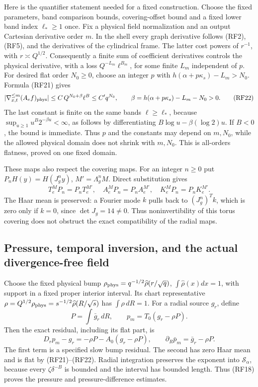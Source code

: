 \documentclass[10pt,a4paper]{article}
\begin{document}
Here is the quantifier statement needed for a fixed construction.
Choose the fixed parameters, band comparison bounds, covering-offset
bound and a fixed lower band index \(\ell_*\ge1\) once. Fix a
physical field normalization and an output Cartesian derivative order
\(m\). In the shell every graph derivative follows (RF2), (RF5),
and the derivatives of the cylindrical frame. The latter cost powers
of \(r^{-1}\), with \(r\asymp Q^{1/2}\). Consequently a
finite sum of coefficient derivatives controls the physical derivative,
with a loss \(Q^{-L_m}\ell^{B_m}\), for some finite \(L_m\)
independent of \(p\). For desired flat order \(N_0\ge0\),
choose an integer \(p\) with
\(h(\alpha+p\kappa_s)-L_m>N_0\). Formula (RF21) gives
\[
|\nabla_{x,t}^{\le m}(A_ef)_{\rm phys}|
\le C\,Q^{N_0+\beta}\ell^B\le C' q^{N_0},
\qquad\beta=h(\alpha+p\kappa_s)-L_m-N_0>0.
\tag{RF22}
\]
The last constant is finite on the same bands \(\ell\ge\ell_*\),
because \(\sup_{u\ge1}u^B2^{-\beta u}<\infty\), as follows by
differentiating \(B\log u-\beta(\log2)u\). If \(B<0\), the
bound is immediate. Thus \(p\) and the constants may depend on
\(m,N_0\), while the allowed physical domain does not shrink with
\(m,N_0\). This is all-orders flatness, proved on one fixed domain.

These maps also respect the covering maps. For an integer \(n\ge0\)
put \(P_nH(y)=H(J_g^ny)\), \(M'=\Lambda_g^nM\). Direct
substitution gives
\[
T_e^{M}P_n=P_nT_e^{M'},\quad A_e^{M}P_n=P_nA_e^{M'},
\quad K_e^{M}P_n=P_nK_e^{M'}.
\tag{RF23}
\]
The Haar mean is preserved: a Fourier mode \(k\) pulls back to
\((J_g^n)^Tk\), which is zero only if \(k=0\), since
\(\det J_g=14\ne0\). Thus noninvertibility of this torus covering
does not obstruct the exact compatibility of the radial maps.

\subsection{Pressure, temporal inversion, and the actual divergence-free field}

Choose the fixed physical bump
\(\rho_{\rm phys}=q^{-1/2}\widehat\rho(r/\sqrt q)\),
\(\int\widehat\rho(x)dx=1\), with support in a fixed proper
interior interval. Its chart representative
\(\rho=Q^{1/2}\rho_{\rm phys}=s^{-1/2}\widehat\rho(R/\sqrt s)\)
has \(\int\rho\,dR=1\). For a radial source \(g_r\), define
\[
P=\int\bar g_r\,dR,\qquad p_m=T_0(g_r-\rho P).
\]
Then the exact residual, including its flat part, is
\[
D_rp_m-g_r=-\rho P-A_0(g_r-\rho P),
\qquad\partial_R\bar p_m=\bar g_r-\rho P.
\tag{RF24}
\]
The first term is a specified slow bump residual. The second has zero
Haar mean and is flat by (RF21)--(RF22). Radial integration preserves
the exponent into \(\mathcal S_\alpha\), because every
\(\zeta\delta^{-B}\) is bounded and the interval has bounded
length. Thus (RF18) proves the pressure and pressure-difference estimates.
\end{document}
